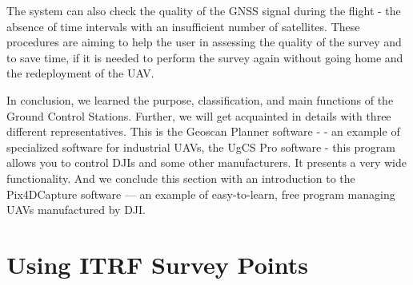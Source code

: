\documentclass[
  letterpaper,
  DIV=11,
  numbers=noendperiod]{scrreprt}
\begin{document}
The system can also check the quality of the GNSS signal during the
flight - the absence of time intervals with an insufficient number of
satellites. These procedures are aiming to help the user in assessing
the quality of the survey and to save time, if it is needed to perform
the survey again without going home and the redeployment of the UAV.

In conclusion, we learned the purpose, classification, and main
functions of the Ground Control Stations. Further, we will get
acquainted in details with three different representatives. This is the
Geoscan Planner software - - an example of specialized software for
industrial UAVs, the UgCS Pro software - this program allows you to
control DJIs and some other manufacturers. It presents a very wide
functionality. And we conclude this section with an introduction to the
Pix4DCapture software --- an example of easy-to-learn, free program
managing UAVs manufactured by DJI.


\hypertarget{using-itrf-survey-points}{%
\chapter{Using ITRF Survey Points}\label{using-itrf-survey-points}}
\end{document}
